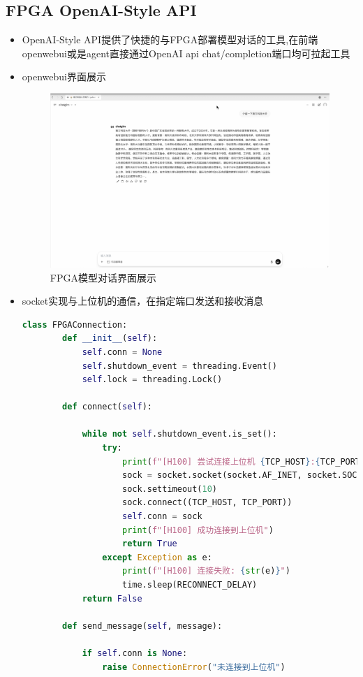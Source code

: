 \documentclass[AutoFakeBold,AutoFakeSlant,language=chinese,degree=bachelor]{sustechthesis}
\begin{document}
\subsection{FPGA OpenAI-Style API}
\begin{itemize}
    \item OpenAI-Style API提供了快捷的与FPGA部署模型对话的工具,在前端openwebui或是agent直接通过OpenAI api chat/completion端口均可拉起工具
        \item openwebui界面展示
            \begin{figure}[H]
                \centering
                \includegraphics[width=.64\textwidth]{./figures/openwebui_display.png}
                \caption{FPGA模型对话界面展示}
            \end{figure}
        \item socket实现与上位机的通信，在指定端口发送和接收消息
        \begin{lstlisting}[language=python]
        class FPGAConnection:
        def __init__(self):
            self.conn = None
            self.shutdown_event = threading.Event()
            self.lock = threading.Lock()
            
        def connect(self):
            
            while not self.shutdown_event.is_set():
                try:
                    print(f"[H100] 尝试连接上位机 {TCP_HOST}:{TCP_PORT}")
                    sock = socket.socket(socket.AF_INET, socket.SOCK_STREAM)
                    sock.settimeout(10)
                    sock.connect((TCP_HOST, TCP_PORT))
                    self.conn = sock
                    print(f"[H100] 成功连接到上位机")
                    return True
                except Exception as e:
                    print(f"[H100] 连接失败: {str(e)}")
                    time.sleep(RECONNECT_DELAY)
            return False
        
        def send_message(self, message):
            
            if self.conn is None:
                raise ConnectionError("未连接到上位机")
                

\end{lstlisting}
\end{itemize}
\end{document}
